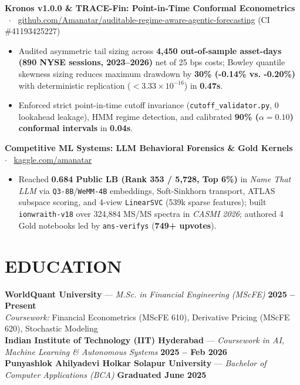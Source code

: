 \documentclass[10pt,a4paper]{article}
\begin{document}
\noindent\textbf{Kronos v1.0.0 \& TRACE-Fin: Point-in-Time Conformal Econometrics} \ $\cdot$ \ \href{https://github.com/Amanatar/auditable-regime-aware-agentic-forecasting}{github.com/Amanatar/auditable-regime-aware-agentic-forecasting} (CI \#41193425227)
\begin{itemize}
    \item Audited asymmetric tail sizing across \textbf{4,450 out-of-sample asset-days (890 NYSE sessions, 2023--2026)} net of 25 bps costs; Bowley quantile skewness sizing reduces maximum drawdown by \textbf{30\% (-0.14\% vs. -0.20\%)} with deterministic replication ($< 3.33 \times 10^{-16}$) in \textbf{0.47s}.
    \item Enforced strict point-in-time cutoff invariance (\texttt{cutoff\_validator.py}, 0 lookahead leakage), HMM regime detection, and calibrated \textbf{90\% ($\alpha = 0.10$) conformal intervals} in \textbf{0.04s}.
\end{itemize}
\vspace{1pt}

\noindent\textbf{Competitive ML Systems: LLM Behavioral Forensics \& Gold Kernels} \ $\cdot$ \ \href{https://www.kaggle.com/amanatar}{kaggle.com/amanatar}
\begin{itemize}
    \item Reached \textbf{0.684 Public LB (Rank 353 / 5,728, Top 6\%)} in \textit{Name That LLM} via \texttt{Q3-8B}/\texttt{WeMM-4B} embeddings, Soft-Sinkhorn transport, ATLAS subspace scoring, and 4-view \texttt{LinearSVC} (539k sparse features); built \texttt{ionwraith-v18} over 324,884 MS/MS spectra in \textit{CASMI 2026}; authored 4 Gold notebooks led by \texttt{ans-verifys} (\textbf{749+ upvotes}).
\end{itemize}

\section*{EDUCATION}
\noindent\textbf{WorldQuant University} --- \textit{M.Sc. in Financial Engineering (MScFE)} \hfill \textbf{2025 -- Present}\\
\textit{Coursework:} Financial Econometrics (MScFE 610), Derivative Pricing (MScFE 620), Stochastic Modeling\\[0.5pt]
\noindent\textbf{Indian Institute of Technology (IIT) Hyderabad} --- \textit{Coursework in AI, Machine Learning \& Autonomous Systems} \hfill \textbf{2025 -- Feb 2026}\\[0.5pt]
\noindent\textbf{Punyashlok Ahilyadevi Holkar Solapur University} --- \textit{Bachelor of Computer Applications (BCA)} \hfill \textbf{Graduated June 2025}
\end{document}
